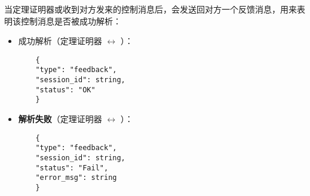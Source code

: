 当定理证明器或收到对方发来的控制消息后，会发送回对方一个反馈消息，用来表明该控制消息是否被成功解析：
\begin{itemize}
	\item \textsf{成功解析}（定理证明器 $\longleftrightarrow$ ）：
	\begin{verbatim}
	{
	"type": "feedback",
	"session_id": string,
	"status": "OK"
	}
	\end{verbatim}
	\item \textbf{解析失败}（定理证明器 $\longleftrightarrow$ ）：
	\begin{verbatim}
	{
	"type": "feedback",
	"session_id": string,
	"status": "Fail",
	"error_msg": string
	}
	\end{verbatim}
\end{itemize}
